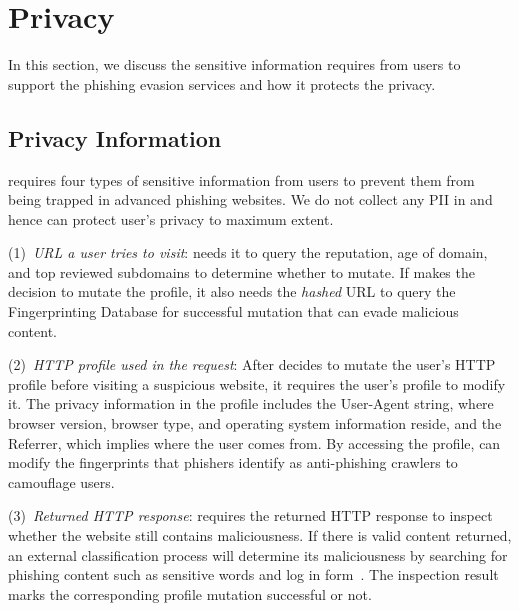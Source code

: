 \section{Privacy}

In this section, we discuss the sensitive information \spartacus requires from users to support the phishing evasion services and how it protects the privacy.

\subsection{Privacy Information}

\spartacus requires four types of sensitive information from users to prevent them from being trapped in advanced phishing websites.
We do not collect any PII in \spartacus and hence can protect user's privacy to maximum extent.

(1)~\emph{URL a user tries to visit}: \spartacus needs it to query the reputation, age of domain, and top reviewed subdomains to determine whether to mutate.
If \spartacus makes the decision to mutate the profile, it also needs the \emph{hashed} URL to query the Fingerprinting Database for successful mutation that can evade malicious content.

(2)~\emph{HTTP profile used in the request}:
After \spartacus decides to mutate the user's HTTP profile before visiting a suspicious website, it requires the user's profile to modify it.
The privacy information in the profile includes the User-Agent string, where browser version, browser type, and operating system information reside, and the Referrer, which implies where the user comes from.
By accessing the profile, \spartacus can modify the fingerprints that phishers identify as anti-phishing crawlers to camouflage users.

(3)~\emph{Returned HTTP response}:
\spartacus requires the returned HTTP response to inspect whether the website still contains maliciousness.
If there is valid content returned,
an external classification process will determine its maliciousness by searching for phishing content such as sensitive words and log in form~\cite{xiang2011cantina+}.
The inspection result marks the corresponding profile mutation successful or not.

